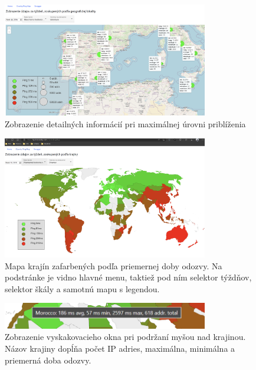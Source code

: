 \begin{figure}
    \centerline{\includegraphics[width=0.8\textwidth]{images/max_zoom}}
    \caption[Zobrazenie detailných informácií pri maximálnej úrovni priblíženia]{Zobrazenie detailných informácií pri maximálnej úrovni priblíženia}
    \label{obr:max_zoom}
\end{figure}
\label{test_interface}



\begin{figure}
    \centerline{\includegraphics[width=0.8\textwidth]{images/country-ping-info}}
    \caption[Mapa krajín zafarbených podľa priemernej doby odozvy]{Mapa krajín zafarbených podľa priemernej doby odozvy. Na podstránke je vidno hlavné menu, 
    taktiež pod ním selektor týždňov, selektor škály a samotnú mapu s legendou.}
    \label{obr:country_ping_info}
\end{figure}


\begin{figure}
    \centerline{\includegraphics[width=0.8\textwidth]{images/country_ping_tooltip}}
    \caption[Zobrazenie vyskakovacieho okna pri podržaní myšou nad krajinou]{Zobrazenie vyskakovacieho okna pri podržaní myšou nad krajinou. Názov krajiny dopĺňa
    počet IP adries, maximálna, minimálna a priemerná doba odozvy.}
    \label{obr:country_ping_tooltip}
\end{figure}